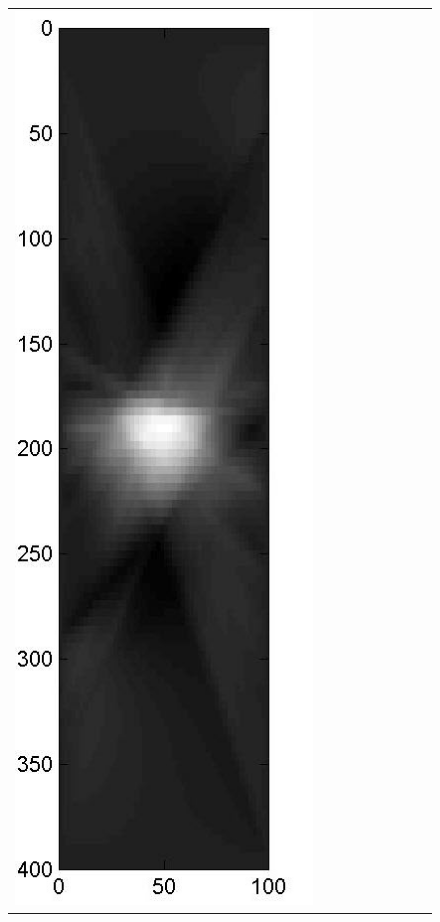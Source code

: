 \documentclass[11pt]{article}
\begin{document}
\begin{figure}[!h]
\begin{center}
\begin{tabular}{|c|c|c|c|c|c|c|c|c|}
			\includegraphics[width=.9\iwidth]{figures/newFigs/noisy/resultsExp-4-mk}
			&

\end{tabular}
\end{center}
\end{figure}
\end{document}
